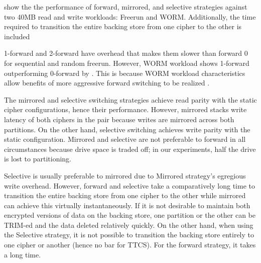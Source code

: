  show the the performance of forward,
mirrored, and selective strategies against two 40MB read and write workloads:
Freerun and WORM.  Additionally, the time
required to transition the entire backing store from one cipher to the other is
included 

1-forward and 2-forward have overhead that makes them slower than forward 0 for
sequential and random freerun. However, WORM workload shows 1-forward
outperforming 0-forward by . This is
because WORM workload characteristics allow benefits of more aggressive forward
switching to be realized .

The mirrored and selective switching strategies achieve read parity with the
static cipher configurations, hence their performance. However, mirrored stacks
write latency of both ciphers in the pair because writes are mirrored across
both partitions. On the other hand, selective switching achieves write parity
with the static configuration. Mirrored and selective are not preferable to
forward in all circumstances because drive space is traded off; in our
experiments, half the drive is lost to partitioning.


Selective is usually preferable to mirrored due to Mirrored strategy's egregious
write overhead. However, forward and selective take a comparatively long time to
transition the entire backing store from one cipher to the other while mirrored
can achieve this virtually instantaneously. If it is not desirable to maintain
both encrypted versions of data on the backing store, one partition or the other
can be TRIM-ed and the data deleted relatively quickly. On the other hand, when
using the Selective strategy, it is not possible to transition the backing store
entirely to one cipher or another (hence no bar for TTCS). For the forward
strategy, it takes a long time. 
